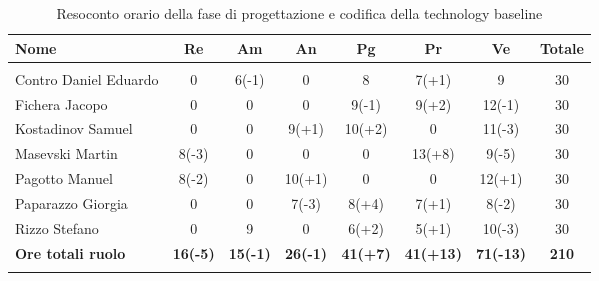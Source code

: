 \documentclass[../piano_di_progetto.tex]{subfiles}
\begin{document}
\begin{center}
	\begin{longtable}{|l|c|c|c|c|c|c|c|}
		\hline
		\rowcolor{lightgray}
		\textbf{Nome} & \textbf{Re} & \textbf{Am} & \textbf{An} & \textbf{Pg}  & \textbf{Pr}   & \textbf{Ve} & \textbf{Totale} \\
		\hline
		\endhead
		
		\hline
		\rowcolor{white}
		\multicolumn{8}{|c|}{\emph{Continua alla pagina successiva...}}\\
		\hline
		\endfoot

		\endlastfoot
	Contro Daniel Eduardo & 0 & 6(-1) & 0 & 8 & 7(+1) & 9 & 30 \\
	Fichera Jacopo & 0 & 0 & 0 & 9(-1) & 9(+2) & 12(-1) & 30 \\
	Kostadinov Samuel & 0 & 0 & 9(+1) & 10(+2) & 0 & 11(-3) & 30 \\			
	Masevski Martin & 8(-3) & 0 & 0 & 0 & 13(+8) & 9(-5) & 30 \\
	Pagotto Manuel & 8(-2) & 0 & 10(+1) & 0 & 0 & 12(+1) & 30 \\			
	Paparazzo Giorgia & 0 & 0 & 7(-3) & 8(+4) & 7(+1) & 8(-2) & 30 \\
	Rizzo Stefano & 0 & 9 & 0 & 6(+2) & 5(+1) & 10(-3) & 30 \\
	\hline
	\textbf{Ore totali ruolo} & \textbf{16(-5)} & \textbf{15(-1)} & \textbf{26(-1)} & \textbf{41(+7)} & \textbf{41(+13)} & \textbf{71(-13)} & \textbf{210} \\
	\hline
		\rowcolor{white}
		\caption{Resoconto orario della fase di progettazione e codifica della technology baseline}
	\end{longtable}
\end{center}
\end{document}
